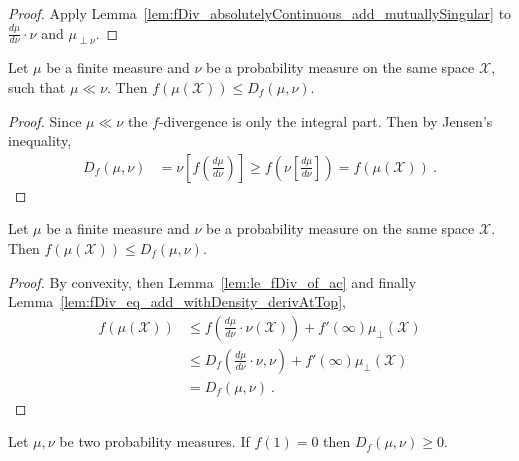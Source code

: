 \begin{proof}\leanok
{}
Apply Lemma~\ref{lem:fDiv_absolutelyContinuous_add_mutuallySingular} to $\frac{d\mu}{d\nu}\cdot \nu$ and $\mu_{\perp \nu}$.
\end{proof}


\begin{lemma}
  \label{lem:le_fDiv_of_ac}
  \leanok
  Let $\mu$ be a finite measure and $\nu$ be a probability measure on the same space $\mathcal X$, such that $\mu \ll \nu$. Then $f(\mu(\mathcal X)) \le D_f(\mu, \nu)$.
\end{lemma}

\begin{proof}\leanok
Since $\mu \ll \nu$ the $f$-divergence is only the integral part. Then by Jensen's inequality,
\begin{align*}
D_f(\mu, \nu)
&= \nu\left[ f\left( \frac{d\mu}{d\nu} \right) \right]
\ge f\left( \nu\left[\frac{d\mu}{d\nu} \right] \right)
= f(\mu(\mathcal X))
\: .
\end{align*}

\end{proof}


\begin{lemma}
  \label{lem:le_fDiv}
  \leanok
  Let $\mu$ be a finite measure and $\nu$ be a probability measure on the same space $\mathcal X$. Then $f(\mu(\mathcal X)) \le D_f(\mu, \nu)$.
\end{lemma}

\begin{proof}\leanok
{}
By convexity, then Lemma~\ref{lem:le_fDiv_of_ac} and finally Lemma~\ref{lem:fDiv_eq_add_withDensity_derivAtTop},
\begin{align*}
f(\mu(\mathcal X))
&\le f(\frac{d\mu}{d\nu}\cdot \nu (\mathcal X)) + f'(\infty)\mu_{\perp}(\mathcal X)
\\
&\le D_f(\frac{d\mu}{d\nu}\cdot \nu , \nu) + f'(\infty)\mu_{\perp}(\mathcal X)
\\
&= D_f(\mu, \nu)
\: .
\end{align*}
\end{proof}


\begin{lemma}
  \label{lem:fDiv_nonneg}
  \leanok
  Let $\mu, \nu$ be two probability measures. If $f(1) = 0$ then $D_f(\mu, \nu) \ge 0$.
\end{lemma}

